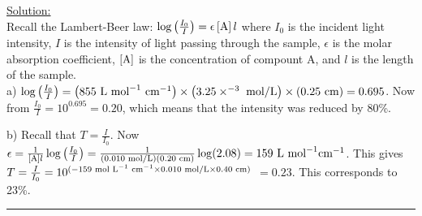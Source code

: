 \noindent
\underline{Solution:}\\

\noindent
Recall the Lambert-Beer law: $\log\left(\frac{I_0}{I}\right) = \epsilon\left[\textnormal{A}\right]l$ where $I_0$ is the incident light intensity, $I$ is the intensity of light passing through the sample, $\epsilon$ is the molar absorption coefficient, $\left[\textnormal{A}\right]$ is the concentration of compount A, and $l$ is the length of the sample.\\

\noindent
a) $\log\left(\frac{I_0}{I}\right) = \left(855\textnormal{ L mol}^{-1}\textnormal{ cm}^{-1}\right)\times\left(3.25\times^{-3}\textnormal{ mol/L}\right)\times\left(0.25\textnormal{ cm}\right) = 0.695$. Now from $\frac{I_0}{I} = 10^{0.695} = 0.20$, which means that the intensity was reduced by 80\%.

\noindent
b) Recall that $T = \frac{I}{I_0}$. Now $\epsilon = \frac{1}{\left[\textnormal{A}\right]l}\log\left(\frac{I_0}{I}\right) = \frac{1}{\left(0.010\textnormal{ mol/L}\right)\left(0.20\textnormal{ cm}\right)}\log(2.08) = 159\textnormal{ L mol}^{-1}\textnormal{cm}^{-1}$. This gives $T = \frac{I}{I_0} = 10^{(-159\textnormal{ mol L}^{-1}\textnormal{ cm}^{-1}\times 0.010\textnormal{ mol/L}\times 0.40\textnormal{ cm})}$ $= 0.23$. This corresponds to 23\%.

\hrule\vspace{0.5cm}



